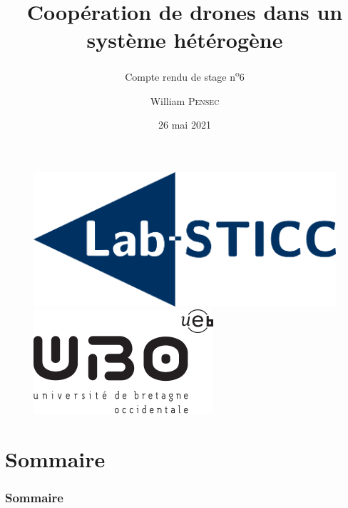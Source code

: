 \documentclass[12pt]{beamer}
\title[Compte rendu de stage n\textsuperscript{o}6]{Coopération de drones dans un système hétérogène}
\subtitle{Compte rendu de stage n\textsuperscript{o}6}
\author{William \textsc{Pensec}}
\institute[Lab-STICC]{Lab-Sticc}
\date{26 mai 2021}
\begin{document}
	\begin{frame}
		\begin{titlepage}
			\begin{figure}[H]
				\centering
				\includegraphics[scale=.15]{labsticc.png}
				\hspace{3cm}
				\includegraphics[scale=.3]{ubo.png}
			\end{figure}
		\end{titlepage}
	\end{frame}
	
	\section*{Sommaire}
	\begin{frame}
		\frametitle{Sommaire}
		\begin{center}
			\tableofcontents
		\end{center}
	\end{frame}
\end{document}
